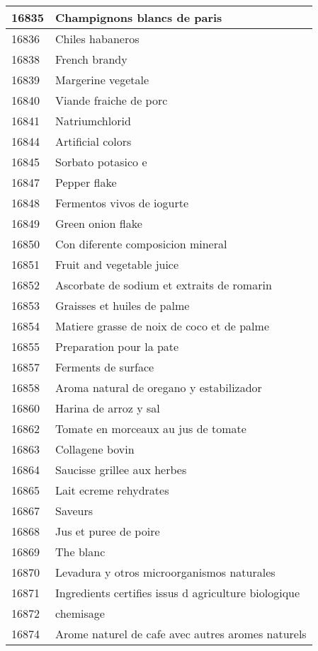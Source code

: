 \begin{longtable}{|l|l|}
16835 & Champignons blancs de paris \\ \hline 
16836 & Chiles habaneros \\ \hline 
16838 & French brandy \\ \hline 
16839 & Margerine vegetale \\ \hline 
16840 & Viande fraiche de porc \\ \hline 
16841 & Natriumchlorid \\ \hline 
16844 & Artificial colors \\ \hline 
16845 & Sorbato potasico e \\ \hline 
16847 & Pepper flake \\ \hline 
16848 & Fermentos vivos de iogurte \\ \hline 
16849 & Green onion flake \\ \hline 
16850 & Con diferente composicion mineral \\ \hline 
16851 & Fruit and vegetable juice \\ \hline 
16852 & Ascorbate de sodium et extraits de romarin \\ \hline 
16853 & Graisses et huiles de palme \\ \hline 
16854 & Matiere grasse de noix de coco et de palme \\ \hline 
16855 & Preparation pour la pate \\ \hline 
16857 & Ferments de surface \\ \hline 
16858 & Aroma natural de oregano y estabilizador \\ \hline 
16860 & Harina de arroz y sal \\ \hline 
16862 & Tomate en morceaux au jus de tomate \\ \hline 
16863 & Collagene bovin \\ \hline 
16864 & Saucisse grillee aux herbes \\ \hline 
16865 & Lait ecreme rehydrates \\ \hline 
16867 & Saveurs \\ \hline 
16868 & Jus et puree de poire \\ \hline 
16869 & The blanc \\ \hline 
16870 & Levadura y otros microorganismos naturales \\ \hline 
16871 & Ingredients certifies issus d agriculture biologique \\ \hline 
16872 & chemisage \\ \hline 
16874 & Arome naturel de cafe avec autres aromes naturels \\ \hline 

\end{longtable}
